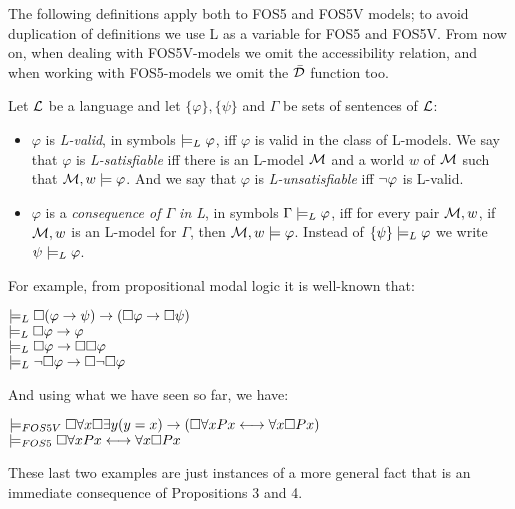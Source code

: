 \qquad The following definitions apply both to FOS5 and FOS5V models; to avoid duplication of definitions we use L as a variable for FOS5 and FOS5V.  From now on, when dealing with FOS5V-models we omit the accessibility relation, and when working with FOS5-models we omit the $\bar{\mathcal{D}}$ function too.  

\pagebreak
\begin{defn}
Let $\mathcal{L}$ be a language and let $\{\varphi\}, \{\psi\}$ and $\Gamma$ be sets of sentences of $\mathcal{L}$:

\begin{itemize} 
\item $\varphi$ is \textit{L-valid}, in symbols $\models_{L} \varphi$, iff $\varphi$ is valid in the class of L-models. We say that $\varphi$ is \textit{L-satisfiable} iff there is an L-model $\mathcal{M}$ and a world $w$ of $\mathcal{M}$ such that $\mathcal{M},w \models \varphi$. And we say that $\varphi$ is \textit{L-unsatisfiable} iff $\neg \varphi$ is L-valid.   
\item $\varphi$ is a \textit{consequence of $\Gamma$ in L}, in symbols $\Gamma \models_{L} \varphi$, iff for every pair $\mathcal{M},w$, if $\mathcal{M},w$ is an L-model for $\Gamma$, then $\mathcal{M},w \models \varphi$. Instead of $\{\psi\} \models_{L} \varphi$ we write $\psi \models_{L} \varphi$.
\end{itemize}
\end{defn}

\qquad For example, from propositional modal logic it is well-known that:

\begin{center}
$\models_{L} \Box (\varphi \rightarrow \psi) \rightarrow (\Box \varphi \rightarrow \Box \psi)$\\
$\models_{L} \Box \varphi \rightarrow \varphi$\\
$\models_{L} \Box \varphi \rightarrow \Box \Box \varphi$\\
$\models_{L} \neg \Box \varphi \rightarrow \Box \neg \Box \varphi$\\
\end{center}


\qquad And using what we have seen so far, we have: 

\begin{center}
$ \models_{FOS5V} \Box \forall x \Box \exists y (y=x) \rightarrow (\Box \forall x Px \longleftrightarrow  \forall x \Box Px)$\\
$\models_{FOS5}  \Box \forall x Px \longleftrightarrow  \forall x \Box Px$\\
\end{center}

\qquad These last two examples are just instances of a more general fact that is an immediate consequence of Propositions 3 and 4.

